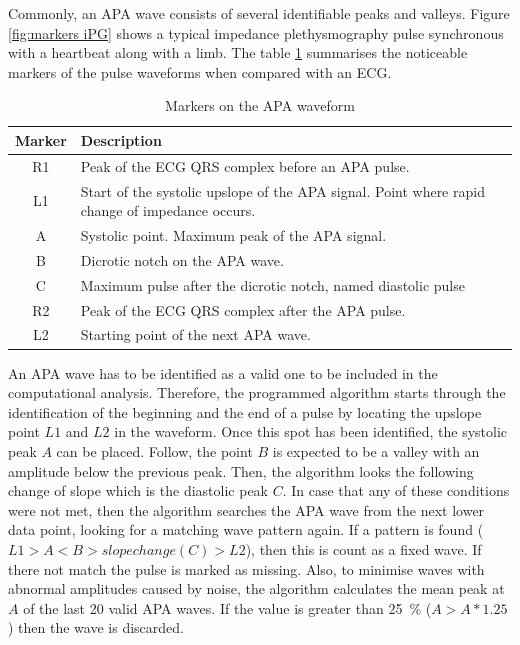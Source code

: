Commonly, an APA wave consists of several identifiable peaks and valleys. Figure \ref{fig:markers iPG} shows a typical impedance plethysmography pulse synchronous with a heartbeat along with a limb. The table \ref{tbl:APA markers} summarises the noticeable markers of the pulse waveforms when compared with an ECG.

\begin{table}[!htpb]
	\caption{Markers on the APA waveform}
	\label{tbl:APA markers}
	\centering
	\begin{tabular}{c p{10cm}}
		\textbf{Marker} & \textbf{Description} \\
		\toprule
		R1 & Peak of the ECG QRS complex before an APA pulse. \\
		L1 & Start of the systolic upslope of the APA signal. Point where  rapid change of impedance occurs. \\
		A & Systolic point. Maximum peak of the APA signal.  \\
		B & Dicrotic notch on the APA wave. \\
		C & Maximum pulse after the dicrotic notch, named diastolic pulse  \\
		R2 & Peak of the ECG QRS complex after the APA pulse.  \\
		L2 & Starting point of the next APA wave. \\
		\bottomrule
	\end{tabular}
\end{table}

An APA wave has to be identified as a valid one to be included in the computational analysis. Therefore, the programmed algorithm starts through the identification of the beginning and the end of a pulse by locating the upslope point $L1$ and $L2$ in the waveform. Once this spot has been identified, the systolic peak $A$ can be placed. Follow, the point $B$ is expected to be a valley with an amplitude below the previous peak. Then, the algorithm looks the following change of slope which is the diastolic peak $C$. In case that any of these conditions were not met, then the algorithm searches the APA wave from the next lower data point, looking for a matching wave pattern again. If a pattern is found ($L1 > A < B > slope change (C) > L2$), then this is count as a fixed wave. If there not match the pulse is marked as missing. Also, to minimise waves with abnormal amplitudes caused by noise, the algorithm calculates the mean peak at $A$ of the last 20 valid APA waves. If the value is greater than \SI{25}{\percent} ($A > A*1.25$) then the wave is discarded.

